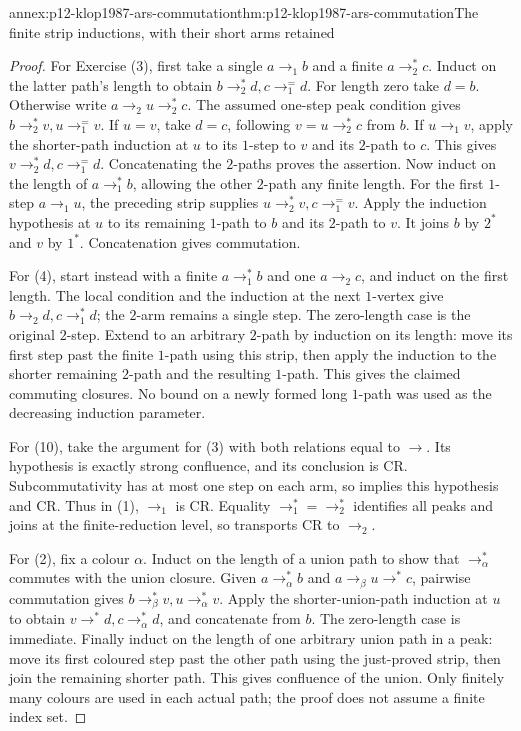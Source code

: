 \begin{annexitem}{annex:p12-klop1987-ars-commutation}{thm:p12-klop1987-ars-commutation}{The finite strip inductions, with their short arms retained}
\begin{proof}
For Exercise (3), first take a single \(a\to_1 b\) and a finite
\(a\to_2^*c\). Induct on the latter path's length to obtain
\(b\to_2^*d,c\to_1^=d\). For length zero take \(d=b\).
Otherwise write \(a\to_2u\to_2^*c\). The assumed one-step
peak condition gives \(b\to_2^*v,u\to_1^=v\).
If \(u=v\), take \(d=c\), following \(v=u\to_2^*c\)
from \(b\). If \(u\to_1v\), apply the shorter-path induction
at \(u\) to its \(1\)-step to \(v\) and its \(2\)-path
to \(c\). This gives \(v\to_2^*d,c\to_1^=d\).
Concatenating the \(2\)-paths proves the assertion.
Now induct on the length of \(a\to_1^*b\), allowing the other
\(2\)-path any finite length. For the first \(1\)-step
\(a\to_1u\), the preceding strip supplies
\(u\to_2^*v,c\to_1^=v\). Apply the induction hypothesis
at \(u\) to its remaining \(1\)-path to \(b\) and its
\(2\)-path to \(v\). It joins \(b\) by \(2^*\) and
\(v\) by \(1^*\). Concatenation gives commutation.

For (4), start instead with a finite \(a\to_1^*b\) and one
\(a\to_2c\), and induct on the first length. The local condition
and the induction at the next \(1\)-vertex give
\(b\to_2d,c\to_1^*d\); the \(2\)-arm remains a single
step. The zero-length case is the original \(2\)-step.
Extend to an arbitrary \(2\)-path by induction on its length:
move its first step past the finite \(1\)-path using this strip,
then apply the induction to the shorter remaining \(2\)-path and
the resulting \(1\)-path. This gives the claimed commuting closures.
No bound on a newly formed long \(1\)-path was used as the
decreasing induction parameter.

For (10), take the argument for (3) with both relations equal to
\(\to\). Its hypothesis is exactly strong confluence, and its
conclusion is CR. Subcommutativity has at most one step on each arm,
so implies this hypothesis and CR. Thus in (1), \(\to_1\) is CR.
Equality \(\to_1^*=\to_2^*\) identifies all peaks and joins
at the finite-reduction level, so transports CR to \(\to_2\).

For (2), fix a colour \(\alpha\). Induct on the length of a union
path to show that \(\to_\alpha^*\) commutes with the union closure.
Given \(a\to_\alpha^*b\) and
\(a\to_\beta u\to^*c\), pairwise commutation gives
\(b\to_\beta^*v,u\to_\alpha^*v\). Apply the shorter-union-path
induction at \(u\) to obtain \(v\to^*d,c\to_\alpha^*d\),
and concatenate from \(b\). The zero-length case is immediate.
Finally induct on the length of one arbitrary union path in a peak:
move its first coloured step past the other path using the just-proved
strip, then join the remaining shorter path. This gives confluence
of the union. Only finitely many colours are used in each actual path;
the proof does not assume a finite index set.
\end{proof}
\end{annexitem}

